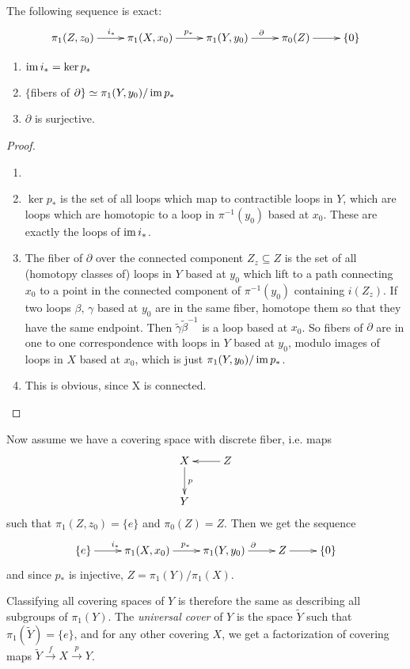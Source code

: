  \begin{claim} The following sequence is exact:
 \[\xymatrix{
  \pi_1(Z,z_0)\ar[r]^{i_*} & \pi_1(X,x_0)\ar[r]^{p_*} & \pi_1(Y,y_0)\ar[r]^\partial & \pi_0(Z)\ar[r] &
  \{0\}
 }\]
   \begin{enumerate}
   \item $\operatorname{im} i_* = \ker p_*$
   \item $\{$fibers of $\partial \} \simeq \pi_1(Y,y_0)/\operatorname{im} p_*$
   \item $\partial $ is surjective.
   \end{enumerate}
 \end{claim}
 \begin{proof}
   \begin{enumerate}\item[]
   \item $\ker p_*$ is the set of all loops which map to contractible loops in
   $Y$, which are loops which are homotopic to a loop in $\pi^{-1}(y_0)$ based at
   $x_0$.  These are exactly the loops of $\operatorname{im} i_*$.
   \item The fiber of $\partial$ over the connected component $Z_z\subseteq Z$ is the
   set of all (homotopy classes of) loops in $Y$ based at $y_0$ which lift to a path connecting $x_0$ to a
   point in the connected component of $\pi^{-1}(y_0)$ containing $i(Z_z)$.
   If two loops $\beta , \, \gamma$ based at $y_0$ are in the same fiber, homotope them so
   that they have the same endpoint.  Then
   $\tilde{\gamma} \tilde \beta^{-1}$ is a loop based at $x_0$.  So fibers of $\partial$ are
   in one to one correspondence with loops in $Y$ based at $y_0$, modulo images of
   loops in $X$ based at $x_0$, which is just $\pi_1(Y, y_0)/ \operatorname{im} p_*$.
   \item This is obvious, since X is connected.
   \end{enumerate}
 \end{proof}

 Now assume we have a covering space with discrete fiber, i.e.  maps
 \[\xymatrix{
  X \ar[d]^{p} & Z \ar[l] \\
  Y
 }\]
 such that $\pi_1(Z, z_0) = \{ e \}$ and $\pi_0(Z)=Z$.
 Then we get the sequence
 \[\xymatrix{
  \{e\} \ar[r]^{i_*} & \pi_1(X,x_0)\ar[r]^{p_*} & \pi_1(Y,y_0)\ar[r]^\partial & Z \ar[r] &
  \{0\}
 }\]
and since $p_*$ is injective, $Z=\pi_1(Y)/\pi_1(X)$.

 Classifying all covering spaces of $Y$ is therefore the same as describing all
 subgroups of $\pi_1(Y)$. The \emph{universal cover} of $Y$ is
 the space $\tilde Y$ such that $\pi_1(\tilde Y)=\{e\}$, and for any other covering
 $X$, we get a factorization of covering maps $\tilde Y \xrightarrow{f}
 X\xrightarrow{p} Y$.

